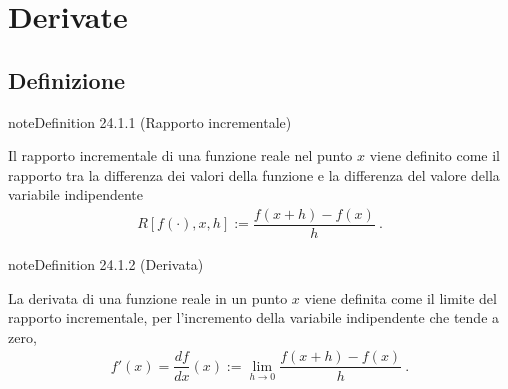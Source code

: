 \documentclass[letterpaper,10pt,italian]{jupyterBook}
\begin{document}
\sphinxstepscope


\chapter{Derivate}
\label{\detokenize{ch/infinitesimal_calculus/derivatives:derivate}}\label{\detokenize{ch/infinitesimal_calculus/derivatives:infinitesimal-calculus-derivatives}}\label{\detokenize{ch/infinitesimal_calculus/derivatives::doc}}

\section{Definizione}
\label{\detokenize{ch/infinitesimal_calculus/derivatives:definizione}}\label{\detokenize{ch/infinitesimal_calculus/derivatives:infinitesimal-calculus-derivatives-def}}\label{ch/infinitesimal_calculus/derivatives:definition-0}
\begin{sphinxadmonition}{note}{Definition 24.1.1 (Rapporto incrementale)}



\sphinxAtStartPar
Il rapporto incrementale di una funzione reale nel punto \(x\) viene definito come il rapporto tra la differenza dei valori della funzione e la differenza del valore della variabile indipendente
\begin{equation}\label{equation:ch/infinitesimal_calculus/derivatives:eq:infinitesimal-calculus:derivatives:def_delta}
\begin{split}R[f(\cdot), x, h] := \dfrac{f(x+h)-f(x)}{h} \ .\end{split}
\end{equation}\end{sphinxadmonition}
\label{ch/infinitesimal_calculus/derivatives:definition-1}
\begin{sphinxadmonition}{note}{Definition 24.1.2 (Derivata)}



\sphinxAtStartPar
La derivata di una funzione reale in un punto \(x\) viene definita come il limite del rapporto incrementale, per l’incremento della variabile indipendente che tende a zero,
\begin{equation}\label{equation:ch/infinitesimal_calculus/derivatives:eq:infinitesimal-calculus:derivatives:def}
\begin{split}f'(x) = \dfrac{d f}{d x}(x) := \lim_{h \rightarrow 0} \dfrac{f(x+h)-f(x)}{h} \ .\end{split}
\end{equation}\end{sphinxadmonition}
\end{document}
